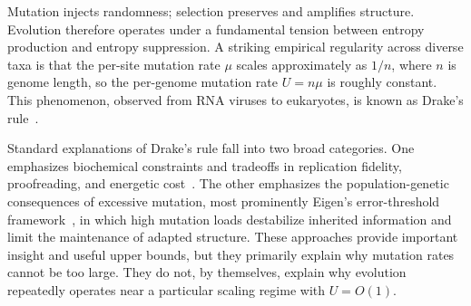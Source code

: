\documentclass[9pt,twocolumn,oneside]{pnas-new}
\title{\TITLE}
\author[a]{Ishanu Chattopadhyay\orcidlink{0000-0001-8339-8162}}
\affil[a]{University of Kentucky}
\begin{document}
  

\maketitle
\thispagestyle{firststyle}





Mutation injects randomness; selection preserves and amplifies structure. Evolution therefore operates under a fundamental tension between entropy production and entropy suppression. A striking empirical regularity across diverse taxa is that the per-site mutation rate $\mu$ scales approximately as $1/n$, where $n$ is genome length, so the per-genome mutation rate $U=n\mu$ is roughly constant. This phenomenon, observed from RNA viruses to eukaryotes, is known as Drake’s rule~\cite{Drake1991,Lynch2010,SniegowskiRaynes2013,Hershberg2015}.

Standard explanations of Drake’s rule fall into two broad categories. One emphasizes biochemical constraints and tradeoffs in replication fidelity, proofreading, and energetic cost~\cite{Lynch2010}. The other emphasizes the population-genetic consequences of excessive mutation, most prominently Eigen’s error-threshold framework~\cite{Eigen1971}, in which high mutation loads destabilize inherited information and limit the maintenance of adapted structure. These approaches provide important insight and useful upper bounds, but they primarily explain why mutation rates cannot be too large. They do not, by themselves, explain why evolution repeatedly operates near a particular scaling regime with $U=O(1)$.
\end{document}
